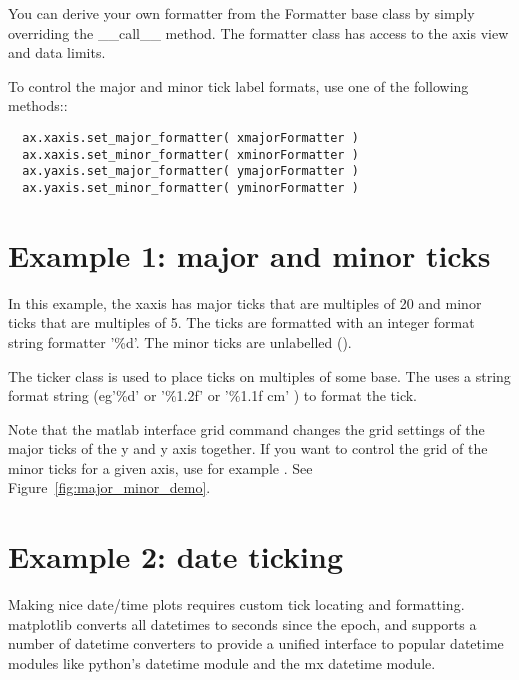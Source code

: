 \documentclass[]{book}
\begin{document}
You can derive your own formatter from the Formatter base class by
simply overriding the \_\_call\_\_ method.  The formatter class has
access to the axis view and data limits.

To control the major and minor tick label formats, use one of the
following methods::

\begin{lstlisting}
  ax.xaxis.set_major_formatter( xmajorFormatter )
  ax.xaxis.set_minor_formatter( xminorFormatter )
  ax.yaxis.set_major_formatter( ymajorFormatter )
  ax.yaxis.set_minor_formatter( yminorFormatter )

\end{lstlisting}

\section{Example 1: major and minor ticks}

In this example, the xaxis has major ticks that are multiples of 20
and minor ticks that are multiples of 5.  The ticks are formatted with
an integer format string formatter '\%d'.  The minor ticks are
unlabelled ().

The  ticker class is used to place ticks on
multiples of some base.  The  uses a string format
string (eg'\%d' or '\%1.2f' or '\%1.1f cm' ) to format the tick.

Note that the matlab interface grid command changes the grid settings
of the major ticks of the y and y axis together.  If you want to
control the grid of the minor ticks for a given axis, use for example
.  See
Figure~\ref{fig:major_minor_demo}.





\section{Example 2: date ticking}

Making nice date/time plots requires custom tick locating and
formatting.  matplotlib converts all datetimes to seconds since the
epoch, and supports a number of datetime converters to provide a
unified interface to popular datetime modules like python's datetime
module and the mx datetime module.
\end{document}

